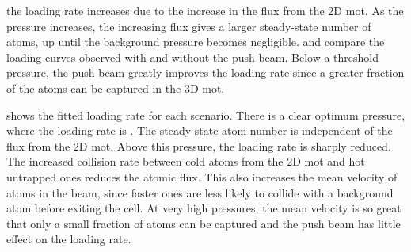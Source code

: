 the loading rate increases due to the increase in the flux from the 2D \ac{mot}.
As the pressure increases, the increasing flux gives a larger steady-state
number of atoms, up until the background pressure becomes negligible.
 and  compare the loading
curves observed with and without the push beam. Below a threshold pressure, the
push beam greatly improves the loading rate since a greater fraction of the
atoms can be captured in the 3D \ac{mot}. 
\par\noindent {} shows the
fitted loading rate for each scenario. There is a clear optimum pressure,
where the loading rate is . The steady-state atom number is
independent of the flux from the 2D \ac{mot}. Above this pressure, the loading rate is
sharply reduced. The increased collision rate between cold atoms from the 2D
\ac{mot} and hot untrapped ones reduces the atomic flux. This also increases the
mean velocity of atoms in the beam, since faster ones are less likely to collide
with a background atom before exiting the cell. At very high pressures, the mean
velocity is so great that only a small fraction of atoms can be captured and the
push beam has little effect on the loading rate.
